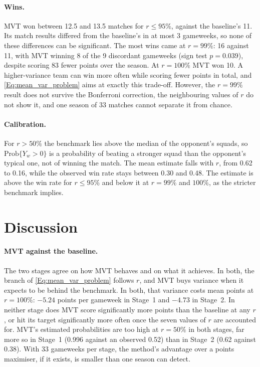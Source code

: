 \documentclass[12pt,oneside,a4paper]{book}
\theoremstyle{definition}
\theoremstyle{remark}
\begin{document}
	\paragraph{Wins.} MVT won between 12.5 and 13.5 matches for $r\le 95\%$, against the baseline's
	11. Its match results differed from the baseline's in at most 3 gameweeks, so none of these
	differences can be significant. The most wins came at $r=99\%$: 16 against 11, with MVT winning
	8 of the 9 discordant gameweeks (sign test $p=0.039$), despite scoring 83 fewer points over the
	season. At $r=100\%$ MVT won 10. A higher-variance team can win more often while scoring fewer
	points in total, and \eqref{Eq:mean_var_problem} aims at exactly this trade-off. However, the $r=99\%$ result does not
	survive the Bonferroni correction, the neighbouring values of $r$ do not show it, and one season
	of 33 matches cannot separate it from chance.

	\paragraph{Calibration.} For $r>50\%$ the benchmark lies above the median of the opponent's
	squads, so $\mathrm{Prob}\{Y_w>0\}$ is a probability of beating a stronger squad than the
	opponent's typical one, not of winning the match. The mean estimate falls with $r$, from 0.62
	to 0.16, while the observed win rate stays between 0.30 and 0.48. The estimate is above the win
	rate for $r\le 95\%$ and below it at $r=99\%$ and $100\%$, as the stricter benchmark implies.

	\section{Discussion}
	\label{sec:discussion}

	\paragraph{MVT against the baseline.} The two stages agree on how MVT behaves and on what it
	achieves. In both, the branch of \eqref{Eq:mean_var_problem} follows $r$, and MVT buys variance when it expects to be
	behind the benchmark. In both, that variance costs mean points at $r=100\%$: $-5.24$ points per
	gameweek in Stage~1 and $-4.73$ in Stage~2. In neither stage does MVT score significantly more
	points than the baseline at any $r$, or hit its target significantly more often once the
	seven values of $r$ are accounted for. MVT's estimated probabilities are too high at $r=50\%$ in
	both stages, far more so in Stage~1 (0.996 against an observed 0.52) than in Stage~2 (0.62
	against 0.38). With 33 gameweeks per stage, the method's advantage over a points maximiser, if
	it exists, is smaller than one season can detect.
\end{document}
